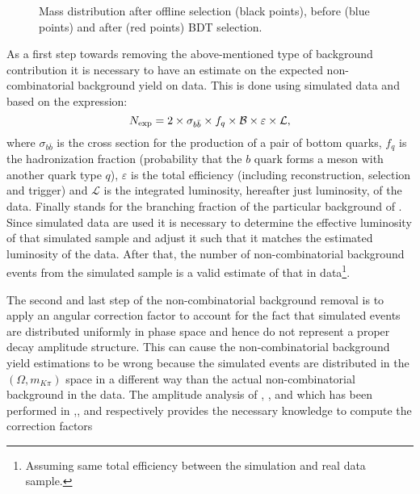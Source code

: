 \begin{figure}[!t]
  \centering
  \scalebox{1}{}
  \caption{Mass distribution after offline selection (black points), before (blue points) and after (red points) BDT selection.}
  \label{mass_BDTG_selection}
\end{figure}

As a first step towards removing the above-mentioned type of background contribution it is necessary to have an estimate
on the expected non-combinatorial background yield on data. This is done using simulated data and based on the expression:
\begin{equation}
N_{\rm exp} = 2 \times \sigma_{b\bar{b}}\times f_q \times {\ensuremath{\cal B}} \times \varepsilon \times {\mathcal{L}},
\end{equation}
\noindent where $\sigma_{b\bar{b}}$ is the cross section for the production of a pair of bottom quarks, $f_q$ is the hadronization fraction
(probability that the $b$ quark forms a meson with another quark type $q$), $\varepsilon$ is the total efficiency (including reconstruction,
selection and trigger) and ${\mathcal{L}}$ is the integrated luminosity, hereafter just luminosity, of the data. Finally \BF stands for the
branching fraction of the particular background of . Since simulated data are used it is necessary to determine
the effective luminosity of that simulated sample and adjust it such that it matches the estimated luminosity of the data. After that, the
number of non-combinatorial background events from the simulated sample is a valid estimate of that in
data\footnote{Assuming same total efficiency between the simulation and real data sample.}.

The second and last step of the non-combinatorial background removal is to apply an angular correction factor to account for the fact that
simulated events are distributed uniformly in phase space and hence do not represent a proper decay amplitude structure.
This can cause the non-combinatorial background yield estimations to be wrong because the simulated events are distributed in the $(\Omega, m_{K\pi})$ space
in a different way than the actual non-combinatorial background in the data. The amplitude analysis of \BdJpsipipi, \BsJpsipipi, \BsJpsiKK and \LbJpsipK
which has been performed in \cite{SheldonBdpipi},\cite{SheldonBspipi},\cite{SheldonKK} and \cite{Gao:1701984} respectively provides
the necessary knowledge to compute the correction factors

